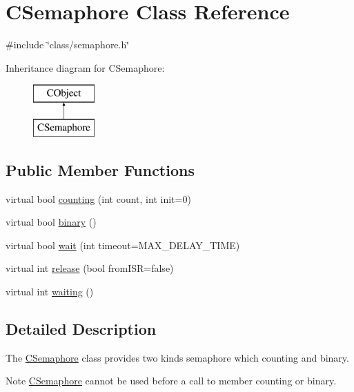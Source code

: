 \hypertarget{class_c_semaphore}{\section{C\-Semaphore Class Reference}
\label{class_c_semaphore}
}


{\ttfamily \#include \char`\"{}class/semaphore.\-h\char`\"{}}

Inheritance diagram for C\-Semaphore\-:\begin{figure}[H]
\begin{center}
\leavevmode
\includegraphics[height=2.000000cm]{d0/d06/class_c_semaphore}
\end{center}
\end{figure}
\subsection*{Public Member Functions}
\begin{DoxyCompactItemize}
\item 
virtual bool \hyperlink{class_c_semaphore_af4e913cd2861355f8be2211ae21753ba}{counting} (int count, int init=0)
\item 
virtual bool \hyperlink{class_c_semaphore_a0fc078dfd286cb3321c6cbaf7bcbb7b2}{binary} ()
\item 
virtual bool \hyperlink{class_c_semaphore_abad6f22e40a0d911e38ade968f4d801a}{wait} (int timeout=M\-A\-X\-\_\-\-D\-E\-L\-A\-Y\-\_\-\-T\-I\-M\-E)
\item 
virtual int \hyperlink{class_c_semaphore_aa1a25ff1be26f8dfdd0f008aeabec8b1}{release} (bool from\-I\-S\-R=false)
\item 
virtual int \hyperlink{class_c_semaphore_a2302ceb8f2f9e1bef3381f457589177d}{waiting} ()
\end{DoxyCompactItemize}


\subsection{Detailed Description}
The \hyperlink{class_c_semaphore}{C\-Semaphore} class provides two kinds semaphore which counting and binary. \begin{DoxyNote}{Note}
\hyperlink{class_c_semaphore}{C\-Semaphore} cannot be used before a call to member counting or binary. 
\end{DoxyNote}


